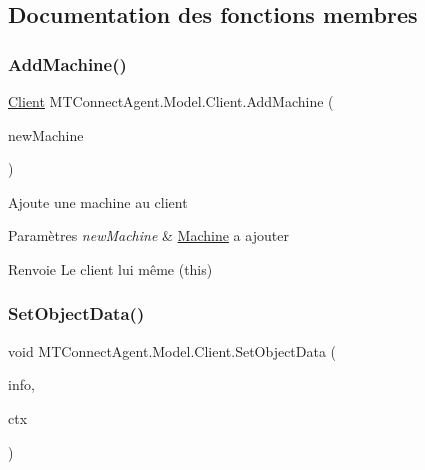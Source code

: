 \subsection{Documentation des fonctions membres}
\mbox{\label{class_m_t_connect_agent_1_1_model_1_1_client_a692b1cbfd5063222488d3af36d8fd703}} 
\subsubsection{\texorpdfstring{Add\+Machine()}{AddMachine()}}
{\footnotesize\ttfamily \mbox{\hyperlink{class_m_t_connect_agent_1_1_model_1_1_client}{Client}} M\+T\+Connect\+Agent.\+Model.\+Client.\+Add\+Machine (\begin{DoxyParamCaption}\item[{\mbox{\hyperlink{class_m_t_connect_agent_1_1_model_1_1_machine}{Machine}}}]{new\+Machine }\end{DoxyParamCaption})\hspace{0.3cm}{\ttfamily [inline]}}



Ajoute une machine au client 


\begin{DoxyParams}{Paramètres}
{\em new\+Machine} & \mbox{\hyperlink{class_m_t_connect_agent_1_1_model_1_1_machine}{Machine}} a ajouter\\
\hline
\end{DoxyParams}
\begin{DoxyReturn}{Renvoie}
Le client lui même (this)
\end{DoxyReturn}
\mbox{\label{class_m_t_connect_agent_1_1_model_1_1_client_a707b7a8486e7ee79d9986f6aa1729f4e}} 
\subsubsection{\texorpdfstring{Set\+Object\+Data()}{SetObjectData()}}
{\footnotesize\ttfamily void M\+T\+Connect\+Agent.\+Model.\+Client.\+Set\+Object\+Data (\begin{DoxyParamCaption}\item[{Serialization\+Info}]{info,  }\item[{Streaming\+Context}]{ctx }\end{DoxyParamCaption})\hspace{0.3cm}{\ttfamily [inline]}}



